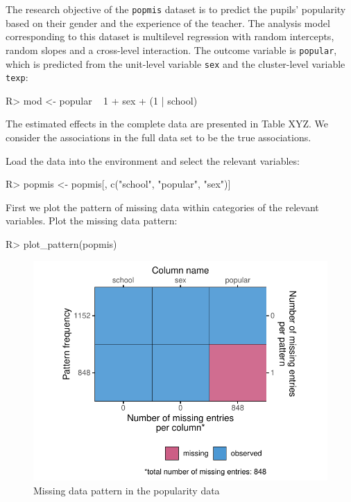 \documentclass[
]{jss}
\begin{document}
The research objective of the \texttt{popmis} dataset is to predict the
pupils' popularity based on their gender and the experience of the
teacher. The analysis model corresponding to this dataset is multilevel
regression with random intercepts, random slopes and a cross-level
interaction. The outcome variable is \texttt{popular}, which is
predicted from the unit-level variable \texttt{sex} and the
cluster-level variable \texttt{texp}:

\begin{CodeChunk}
\begin{CodeInput}
R> mod <- popular ~ 1 + sex + (1 | school)
\end{CodeInput}
\end{CodeChunk}

The estimated effects in the complete data are presented in Table XYZ.
We consider the associations in the full data set to be the true
associations.

Load the data into the environment and select the relevant variables:

\begin{CodeChunk}
\begin{CodeInput}
R> popmis <- popmis[, c("school", "popular", "sex")] 
\end{CodeInput}
\end{CodeChunk}

First we plot the pattern of missing data within categories of the
relevant variables. Plot the missing data pattern:

\begin{CodeChunk}
\begin{CodeInput}
R> plot_pattern(popmis)
\end{CodeInput}
\begin{figure}

{\centering \includegraphics{Imputation_of_Incomplete_Multilevel_Data_files/figure-latex/pop_pat-1} 

}

\caption[Missing data pattern in the popularity data]{Missing data pattern in the popularity data}\label{fig:pop_pat}
\end{figure}
\end{CodeChunk}
\end{document}
